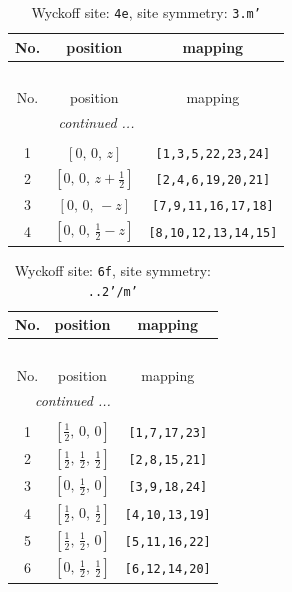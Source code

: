 \documentclass[fleqn,8pt]{jsarticle}
\begin{document}
\renewcommand{\arraystretch}{1.2}
\begin{longtable}{ccc}
\caption{Wyckoff site: {\tt 4e}, site symmetry: {\tt 3.m'}}
 \\
 \hline \hline
No. & position & mapping \\ \hline \endfirsthead

\multicolumn{2}{l}{\tablename\ \thetable{}} \\
 \hline \hline
No. & position & mapping \\ \hline \endhead

 \hline \hline
\multicolumn{2}{r}{\footnotesize\it continued ...} \\ \endfoot

 \hline \hline
\multicolumn{2}{r}{} \\ \endlastfoot

1 & $\left[ 0,\, 0,\, z \right]$ & {\tt [1,3,5,22,23,24]} \\ \hline
2 & $\left[ 0,\, 0,\, z + \frac{1}{2} \right]$ & {\tt [2,4,6,19,20,21]} \\ \hline
3 & $\left[ 0,\, 0,\, - z \right]$ & {\tt [7,9,11,16,17,18]} \\ \hline
4 & $\left[ 0,\, 0,\, \frac{1}{2} - z \right]$ & {\tt [8,10,12,13,14,15]} \\
\end{longtable}
\renewcommand{\arraystretch}{1.2}
\begin{longtable}{ccc}
\caption{Wyckoff site: {\tt 6f}, site symmetry: {\tt ..2'/m'}}
 \\
 \hline \hline
No. & position & mapping \\ \hline \endfirsthead

\multicolumn{2}{l}{\tablename\ \thetable{}} \\
 \hline \hline
No. & position & mapping \\ \hline \endhead

 \hline \hline
\multicolumn{2}{r}{\footnotesize\it continued ...} \\ \endfoot

 \hline \hline
\multicolumn{2}{r}{} \\ \endlastfoot

1 & $\left[ \frac{1}{2},\, 0,\, 0 \right]$ & {\tt [1,7,17,23]} \\ \hline
2 & $\left[ \frac{1}{2},\, \frac{1}{2},\, \frac{1}{2} \right]$ & {\tt [2,8,15,21]} \\ \hline
3 & $\left[ 0,\, \frac{1}{2},\, 0 \right]$ & {\tt [3,9,18,24]} \\ \hline
4 & $\left[ \frac{1}{2},\, 0,\, \frac{1}{2} \right]$ & {\tt [4,10,13,19]} \\ \hline
5 & $\left[ \frac{1}{2},\, \frac{1}{2},\, 0 \right]$ & {\tt [5,11,16,22]} \\ \hline
6 & $\left[ 0,\, \frac{1}{2},\, \frac{1}{2} \right]$ & {\tt [6,12,14,20]} \\
\end{longtable}
\end{document}
